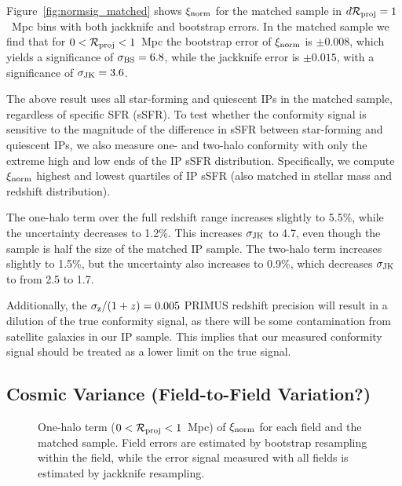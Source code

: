 Figure~\ref{fig:normsig_matched} shows $\signorm$ for the matched sample in ${d\mathcal{R}_{\text{proj}}=1}$~Mpc bins with both jackknife and bootstrap errors.
In the matched sample we find that for ${0<\mathcal{R}_{\text{proj}}<1}$~Mpc the bootstrap error of $\signorm$ is ${\pm0.008}$, which yields a significance of $\sigmaBS=6.8$, while the jackknife error is ${\pm0.015}$, with a significance of $\sigmaJK=3.6$.
 
The above result uses all star-forming and quiescent IPs in the matched sample, regardless of specific SFR (sSFR).  
To test whether the conformity signal is sensitive to the magnitude of the difference in sSFR between star-forming and quiescent IPs, we also measure one- and two-halo conformity with only the extreme high and low ends of the IP sSFR distribution.  Specifically, we compute $\signorm$ highest and lowest quartiles of IP sSFR (also matched in stellar mass and redshift distribution).

The one-halo term over the full redshift range increases slightly to 5.5\%, while the uncertainty decreases to 1.2\%.
This increases $\sigmaJK$ to 4.7, even though the sample is half the size of the matched IP sample.
The two-halo term increases slightly to 1.5\%, but the uncertainty also increases to 0.9\%, which decreases $\sigmaJK$ to from 2.5 to 1.7.

Additionally, the ${\sigmaz/(1+z) = 0.005}$ PRIMUS redshift precision will result in a dilution of the 
true conformity signal, as there will be some contamination from satellite galaxies in our IP sample.
This implies that our measured conformity signal should be treated as a lower limit on the true signal.

\subsection{Cosmic Variance (Field-to-Field Variation?)}\label{sec:cosmic_var}

\begin{figure}
  \epstrim{0.4in 0.7in 0.3in 0.3in}
  \caption{
One-halo term ($0<\mathcal{R}_{\text{proj}}<1$~Mpc) of $\signorm$ for each field and the matched sample.
Field errors are estimated by bootstrap resampling within the field, while the error signal measured with all fields is estimated by jackknife resampling.
}
  \label{fig:normsig_fields_1halo}
\end{figure}

